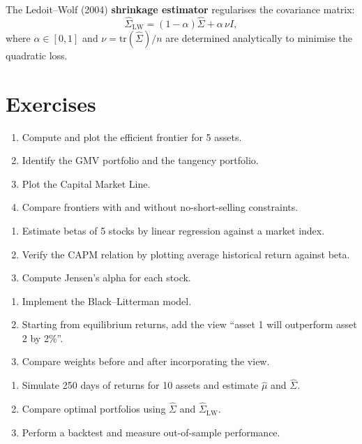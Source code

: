 \begin{proposition}
The Ledoit--Wolf (2004) \textbf{shrinkage estimator} regularises the
covariance matrix:
\[
    \hat{\Sigma}_{\text{LW}} = (1-\alpha)\hat{\Sigma} + \alpha\,\nu I,
\]
where $\alpha \in [0,1]$ and $\nu = \text{tr}(\hat{\Sigma})/n$ are
determined analytically to minimise the quadratic loss.
\end{proposition}

\section{Exercises}

\begin{exercise}
\begin{enumerate}
    \item Compute and plot the efficient frontier for 5 assets.
    \item Identify the GMV portfolio and the tangency portfolio.
    \item Plot the Capital Market Line.
    \item Compare frontiers with and without no-short-selling constraints.
\end{enumerate}
\end{exercise}

\begin{exercise}
\begin{enumerate}
    \item Estimate betas of 5 stocks by linear regression against a
          market index.
    \item Verify the CAPM relation by plotting average historical return
          against beta.
    \item Compute Jensen's alpha for each stock.
\end{enumerate}
\end{exercise}

\begin{exercise}
\begin{enumerate}
    \item Implement the Black--Litterman model.
    \item Starting from equilibrium returns, add the view ``asset 1 will
          outperform asset 2 by 2\%''.
    \item Compare weights before and after incorporating the view.
\end{enumerate}
\end{exercise}

\begin{exercise}
\begin{enumerate}
    \item Simulate 250 days of returns for 10 assets and estimate
          $\hat{\mu}$ and $\hat{\Sigma}$.
    \item Compare optimal portfolios using $\hat{\Sigma}$ and
          $\hat{\Sigma}_{\text{LW}}$.
    \item Perform a backtest and measure out-of-sample performance.
\end{enumerate}
\end{exercise}
